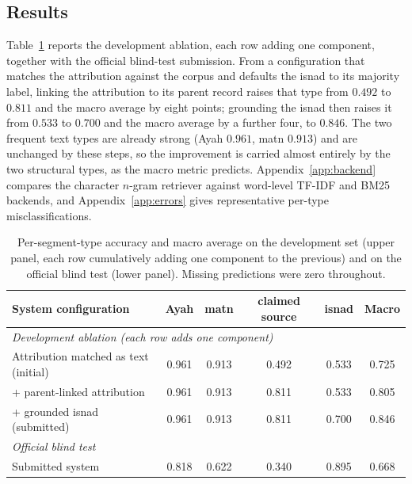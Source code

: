 \documentclass[11pt]{article}
\begin{document}
\subsection{Results}
Table~\ref{tab:main} reports the development ablation, each row adding one component, together with the
official blind-test submission. From a configuration that matches the attribution against the corpus
and defaults the isnad to its majority label, linking the attribution to its parent record raises that
type from $0.492$ to $0.811$ and the macro average by eight points; grounding the isnad then raises it
from $0.533$ to $0.700$ and the macro average by a further four, to $0.846$. The two frequent text
types are already strong (Ayah $0.961$, matn $0.913$) and are unchanged by these steps, so the
improvement is carried almost entirely by the two structural types, as the macro metric predicts.
Appendix~\ref{app:backend} compares the character $n$-gram retriever against word-level TF-IDF and
BM25 backends, and Appendix~\ref{app:errors} gives representative per-type misclassifications.

\begin{table}[t]
\centering\small
\setlength{\tabcolsep}{10pt}
\begin{tabular}{lccccc}
\toprule
\textbf{System configuration} & \textbf{Ayah} & \textbf{matn} & \textbf{claimed source} & \textbf{isnad} & \textbf{Macro} \\
\midrule
\multicolumn{6}{l}{\emph{Development ablation (each row adds one component)}}\\
Attribution matched as text (initial) & 0.961 & 0.913 & 0.492 & 0.533 & 0.725 \\
\;+ parent-linked attribution & 0.961 & 0.913 & 0.811 & 0.533 & 0.805 \\
\;+ grounded isnad (submitted) & 0.961 & 0.913 & 0.811 & 0.700 & 0.846 \\
\midrule
\multicolumn{6}{l}{\emph{Official blind test}}\\
Submitted system & 0.818 & 0.622 & 0.340 & 0.895 & 0.668 \\
\bottomrule
\end{tabular}
\caption{Per-segment-type accuracy and macro average on the development set (upper panel, each row
cumulatively adding one component to the previous) and on the official blind test (lower panel).
Missing predictions were zero throughout.}
\label{tab:main}
\end{table}
\end{document}
